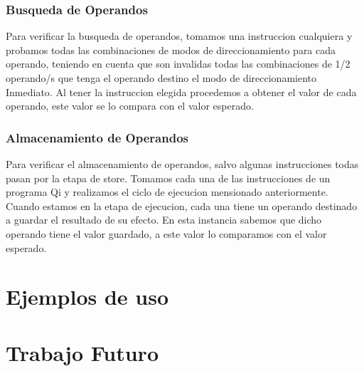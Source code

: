 \subsubsection{Busqueda de Operandos}

Para verificar la busqueda de operandos, tomamos una instruccion cualquiera y probamos todas las combinaciones de modos de direccionamiento para cada operando, teniendo en cuenta que son invalidas todas las combinaciones de 1/2 operando/s que tenga el operando destino el modo de direccionamiento Inmediato. Al tener la instruccion elegida procedemos a obtener el valor de cada operando, este valor se lo compara con el valor esperado. 
 
\subsubsection{Almacenamiento de Operandos}

Para verificar el almacenamiento de operandos, salvo algunas instrucciones todas pasan por la etapa de store.
Tomamos cada una de las instrucciones de un programa Qi y realizamos el ciclo de ejecucion mensionado anteriormente.
Cuando estamos en la etapa de ejecucion, cada una tiene un operando destinado a guardar el resultado de su efecto.
En esta instancia sabemos que  dicho operando tiene el valor guardado, a este valor lo comparamos con el valor esperado.

\section{Ejemplos de uso}


\section{Trabajo Futuro}

